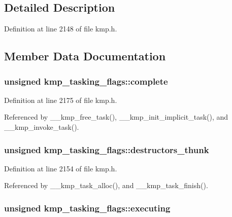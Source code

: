 \subsection{Detailed Description}


Definition at line 2148 of file kmp.\-h.



\subsection{Member Data Documentation}
\hypertarget{structkmp__tasking__flags_a2bef3eff248d8bbbeaea3f77f918b1fc}{
\subsubsection[{complete}]{\setlength{\rightskip}{0pt plus 5cm}unsigned kmp\-\_\-tasking\-\_\-flags\-::complete}}\label{structkmp__tasking__flags_a2bef3eff248d8bbbeaea3f77f918b1fc}


Definition at line 2175 of file kmp.\-h.



Referenced by \-\_\-\-\_\-kmp\-\_\-free\-\_\-task(), \-\_\-\-\_\-kmp\-\_\-init\-\_\-implicit\-\_\-task(), and \-\_\-\-\_\-kmp\-\_\-invoke\-\_\-task().

\hypertarget{structkmp__tasking__flags_a998b866c0ee12e696ddb77d334b61e72}{
\subsubsection[{destructors\-\_\-thunk}]{\setlength{\rightskip}{0pt plus 5cm}unsigned kmp\-\_\-tasking\-\_\-flags\-::destructors\-\_\-thunk}}\label{structkmp__tasking__flags_a998b866c0ee12e696ddb77d334b61e72}


Definition at line 2154 of file kmp.\-h.



Referenced by \-\_\-\-\_\-kmp\-\_\-task\-\_\-alloc(), and \-\_\-\-\_\-kmp\-\_\-task\-\_\-finish().

\hypertarget{structkmp__tasking__flags_a52dcbb49f0b94ac8ff3e130a54df591c}{
\subsubsection[{executing}]{\setlength{\rightskip}{0pt plus 5cm}unsigned kmp\-\_\-tasking\-\_\-flags\-::executing}}\label{structkmp__tasking__flags_a52dcbb49f0b94ac8ff3e130a54df591c}


